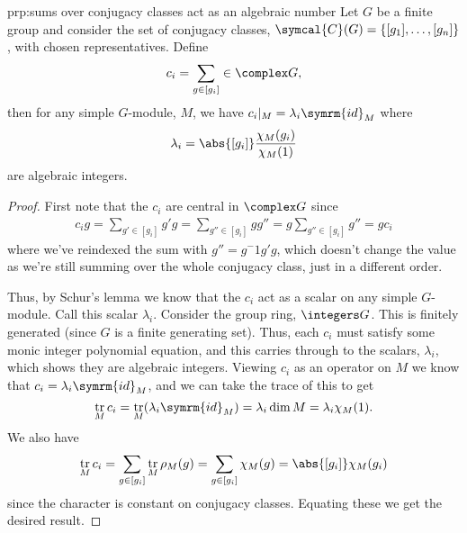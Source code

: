 \documentclass[fleqn]{NotesClass}
\newcommand{\id}{\symrm{id}}
\DeclareMathOperator{\tr}{tr}
\newcommand{\conjugacyClasses}{\symcal{C}}
\begin{document}
    \begin{prp}{}{prp:sums over conjugacy classes act as an algebraic number}
        Let \(G\) be a finite group and consider the set of conjugacy classes, \(\conjugacyClasses(G) = \{[g_1], \dotsc, [g_n]\}\), with chosen representatives.
        Define
        \begin{equation}
            c_i = \sum_{g \in [g_i]} \in \complex G,
        \end{equation}
        then for any simple \(G\)-module, \(M\), we have \(c_i|_M = \lambda_i \id_M\) where
        \begin{equation}
            \lambda_i = \abs{[g_i]} \frac{\chi_M(g_i)}{\chi_M(1)}
        \end{equation}
        are algebraic integers.
        \begin{proof}
            First note that the \(c_i\) are central in \(\complex G\) since
            \begin{align}
                c_i g = \sum_{g' \in [g_i]} g'g = \sum_{g'' \in [g_i]} gg'' = g \sum_{g'' \in [g_i]} g'' = g c_i
            \end{align}
            where we've reindexed the sum with \(g'' = g^-1 g'g\), which doesn't change the value as we're still summing over the whole conjugacy class, just in a different order.
            
            Thus, by Schur's lemma we know that the \(c_i\) act as a scalar on any simple \(G\)-module.
            Call this scalar \(\lambda_i\).
            Consider the group ring, \(\integers G\).
            This is finitely generated (since \(G\) is a finite generating set).
            Thus, each \(c_i\) must satisfy some monic integer polynomial equation, and this carries through to the scalars, \(\lambda_i\), which shows they are algebraic integers.
            Viewing \(c_i\) as an operator on \(M\) we know that \(c_i = \lambda_i \id_M\), and we can take the trace of this to get
            \begin{equation}
                \tr_M c_i = \tr_M (\lambda_i \id_M) = \lambda_i \dim M = \lambda_i \chi_M(1).
            \end{equation}
            We also have
            \begin{equation}
                \tr_M c_i = \sum_{g \in [g_i]} \tr_M \rho_M(g) = \sum_{g \in [g_i]} \chi_M(g) = \abs{[g_i]} \chi_M(g_i)
            \end{equation}
            since the character is constant on conjugacy classes.
            Equating these we get the desired result.
        \end{proof}
    \end{prp}
    
\end{document}
